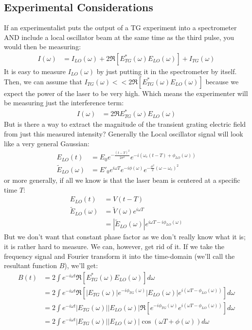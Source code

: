 \subsection{Experimental Considerations}
If an experimentalist puts the output of a TG experiment into a spectrometer AND include a local oscillator beam at the same time as the third pulse, you would then be measuring:
\begin{align*}
	I(\omega) &= I_{LO} (\omega) + 2\Re\left[ E_{TG}^* (\omega) E_{LO} (\omega) \right]+ I_{TG} (\omega)
\end{align*}
It is easy to measure $I_{LO} (\omega) $ by just putting it in the spectrometer by itself.  Then, we can assume that $I_{TG} (\omega) << 2 \Re\left[ E_{TG}^* (\omega) E_{LO} (\omega) \right] $ because we expect the power of the laser to be very high.  Which means the experimenter will be measuring just the interference term:
\begin{align*}
	I(\omega) &=  2 \Re E_{TG}^* (\omega) E_{LO} (\omega)
\end{align*}
But is there a way to extract the magnitude of the transient grating electric field from just this measured intensity?  Generally the Local oscillator signal will look like a very general Gaussian:
\begin{align*}
	E_{LO} (t) &= E_0 e^{-\frac{(t-T)^2}{ 2 \sigma^2}} e^{ -i \left( \omega_c (t- T) +  \phi_{LO}(\omega) \right)} \\
	\tilde{E}_{LO} (\omega) &= E'_0 e^{i \omega T} e^{-i \phi(\omega) }  e^{-\frac{\sigma^2}{2} \left(\omega - \omega_c\right)^2 }
\end{align*}
or more generally, if all we know is that the laser beam is centered at a specific time $T$:
\begin{align*}
	E_{LO} (t) &= V(t - T) \\
	\tilde{E}_{LO} (\omega) &= \tilde{V} (\omega) e^{i \omega T}\\
	&= |\tilde{E}_{LO} (\omega)| e^{i \omega T - i \phi_{LO} (\omega)}
\end{align*}
But we don't want that constant phase factor as we don't really know what it is; it is rather hard to measure.  We can, however, get rid of it.  If we take the frequency signal and Fourier transform it into the time-domain (we'll call the resultant function $B$), we'll get:
\begin{align*}
	B(t)&= 2\int e^{-i \omega t}\Re\left[ E_{TG}^* (\omega) E_{LO} (\omega) \right] d \omega  \\
	&= 2\int e^{-i \omega t}\Re\left[ \left| E_{TG}(\omega)\right| e^{-i \phi_{TG}(\omega)} \left| E_{LO} (\omega) \right| e^{i(\omega T -  \phi_{LO}(\omega))}  \right] d \omega  \\
	&= 2\int e^{-i \omega t} \left| E_{TG}(\omega)\right|  \left| E_{LO} (\omega) \right|  \Re\left[e^{-i \phi_{TG}(\omega)}  e^{i(\omega T -  \phi_{LO}(\omega))} \right] d \omega  \\
	&= 2\int e^{-i \omega t} \left| E_{TG}(\omega)\right|  \left| E_{LO} (\omega) \right|  \cos  \left( \omega T + \phi (\omega) \right) d \omega
\end{align*}
